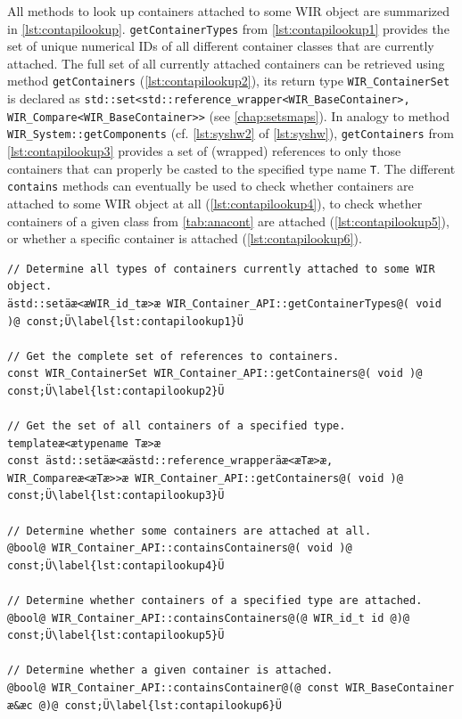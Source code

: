 All methods to look up containers attached to some \gls{WIR} object are summarized in \cref{lst:contapilookup}.
\texttt{getContainer\-Types} from \cref{lst:contapilookup1} provides the set of unique numerical IDs of all different container classes that are currently attached.
The full set of all currently attached containers can be retrieved using method \texttt{getContainers} (\cref{lst:contapilookup2}), its return type \texttt{WIR\_ContainerSet} is declared as \texttt{std::set<std::reference\_wrapper<WIR\_BaseContainer>, WIR\_Compare<WIR\_BaseContainer>{}>} (see \cref{chap:setsmaps}).
In analogy to method \texttt{WIR\_System::getComponents} (cf. \cref{lst:syshw2} of \cref{lst:syshw}), \texttt{getContainers} from \cref{lst:contapilookup3} provides a set of (wrapped) references to only those containers that can properly be casted to the specified type name \texttt{T}.
The different \texttt{contains} methods can eventually be used to check whether containers are attached to some \gls{WIR} object at all (\cref{lst:contapilookup4}), to check whether containers of a given class from \cref{tab:anacont} are attached (\cref{lst:contapilookup5}), or whether a specific container is attached (\cref{lst:contapilookup6}).

\begin{lstlisting}[style=code,float=t,caption={Lookup of WIR Containers},label=lst:contapilookup]
// Determine all types of containers currently attached to some WIR object.
ästd::setäæ<æWIR_id_tæ>æ WIR_Container_API::getContainerTypes@( void )@ const;Ü\label{lst:contapilookup1}Ü

// Get the complete set of references to containers.
const WIR_ContainerSet WIR_Container_API::getContainers@( void )@ const;Ü\label{lst:contapilookup2}Ü

// Get the set of all containers of a specified type.
templateæ<ætypename Tæ>æ
const ästd::setäæ<æästd::reference_wrapperäæ<æTæ>æ, WIR_Compareæ<æTæ>>æ WIR_Container_API::getContainers@( void )@ const;Ü\label{lst:contapilookup3}Ü

// Determine whether some containers are attached at all.
@bool@ WIR_Container_API::containsContainers@( void )@ const;Ü\label{lst:contapilookup4}Ü

// Determine whether containers of a specified type are attached.
@bool@ WIR_Container_API::containsContainers@(@ WIR_id_t id @)@ const;Ü\label{lst:contapilookup5}Ü

// Determine whether a given container is attached.
@bool@ WIR_Container_API::containsContainer@(@ const WIR_BaseContainer æ&æc @)@ const;Ü\label{lst:contapilookup6}Ü
\end{lstlisting}

